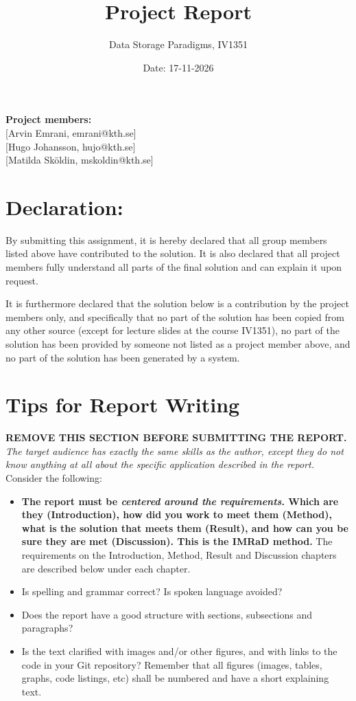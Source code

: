 \documentclass[a4paper]{scrartcl}
\title{Project Report}
\subtitle{Data Storage Paradigms, IV1351}
\author{}
\date{Date: 17-11-2026}
\begin{document}
\maketitle
\noindent\textbf{Project members:} \\ \hfill
[Arvin Emrani, emrani@kth.se] \\ \hfill
[Hugo Johansson, hujo@kth.se] \\ \hfill
[Matilda Sköldin, mskoldin@kth.se] \\ \hfill

\section*{Declaration:}

By submitting this assignment, it is hereby declared that all group members listed above have contributed to the solution. It is also declared that all project members fully understand all parts of the final solution and can explain it upon request.

It is furthermore declared that the solution below is a contribution by the project members only, and specifically that no part of the solution has been copied from any other source (except for lecture slides at the course IV1351), no part of the solution has been provided by someone not listed as a project member above, and no part of the solution has been generated by a system.

\section*{Tips for Report Writing}
\textbf{REMOVE THIS SECTION BEFORE SUBMITTING THE REPORT.}\\

\noindent \textit{The target audience has exactly the same skills as the author, except they do not know anything at all about the specific application described in the report.} \\

Consider the following:

\begin{itemize}
  \item \textbf{The report must be \textit{centered around the requirements}. Which are they (Introduction), how did you work to meet them (Method), what is the solution that meets them (Result), and how can you be sure they are met (Discussion). This is the IMRaD method.} The requirements on the Introduction, Method, Result and Discussion chapters are described below under each chapter.

  \item Is spelling and grammar correct? Is spoken language avoided?

  \item Does the report have a good structure with sections, subsections and paragraphs?

  \item Is the text clarified with images and/or other figures, and with links to the code in your Git repository? Remember that all figures (images, tables, graphs, code listings, etc) shall be numbered and have a short explaining text.
\end{itemize}
\end{document}
